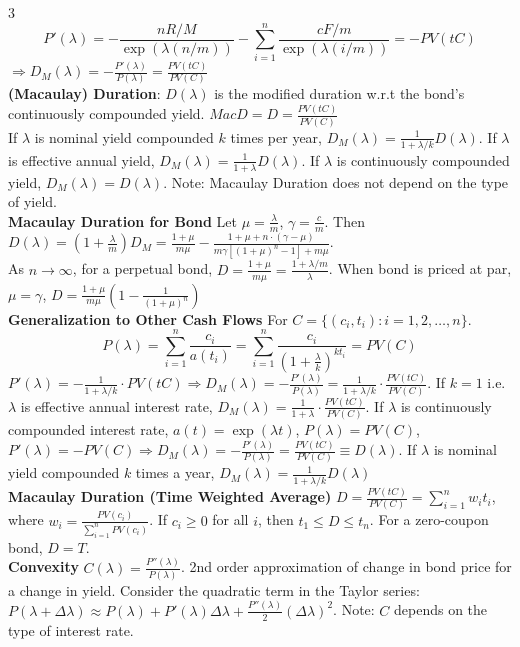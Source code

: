 \documentclass{article}
\begin{document}
{\begin{multicols*}{3}
\vspace{-10pt}
$$P'(\lambda)=-\frac{nR/M}{\exp(\lambda(n/m))}-\sum_{i=1}^n\frac{cF/m}{\exp(\lambda(i/m))}=-PV(tC)$$
$\Rightarrow D_M(\lambda)=-\frac{P'(\lambda)}{P(\lambda)}=\frac{PV(tC)}{PV(C)}$\\
\textbf{(Macaulay) Duration}: $D(\lambda)$ is the modified duration w.r.t the bond's continuously compounded yield. $MacD=D=\frac{PV(tC)}{PV(C)}$\\
If $\lambda$ is nominal yield compounded $k$ times per year, $D_M(\lambda)=\frac{1}{1+\lambda/k}D(\lambda)$. If $\lambda$ is effective annual yield, $D_M(\lambda)=\frac{1}{1+\lambda}D(\lambda)$. If $\lambda$ is continuously compounded yield, $D_M(\lambda)=D(\lambda)$. Note: Macaulay Duration does not depend on the type of yield.\\
\textbf{Macaulay Duration for Bond} Let $\mu=\frac{\lambda}{m}$, $\gamma=\frac{c}{m}$. Then $D(\lambda)=(1+\frac{\lambda}{m})D_M=\frac{1+\mu}{m\mu}-\frac{1+\mu+n\cdot(\gamma-\mu)}{m\gamma[(1+\mu)^n-1]+m\mu}$. \\
As $n\to\infty$, for a perpetual bond, $D=\frac{1+\mu}{m\mu}=\frac{1+\lambda/m}{\lambda}$. When bond is priced at par, $\mu=\gamma$, $D=\frac{1+\mu}{m\mu}\left(1-\frac{1}{(1+\mu)^n}\right)$\\
\textbf{Generalization to Other Cash Flows} For $C=\{(c_i,t_i):i=1,2,\dots,n\}$. 
\vspace{-5pt}
$$P(\lambda)=\sum_{i=1}^n\frac{c_i}{a(t_i)}=\sum_{i=1}^n\frac{c_i}{(1+\frac{\lambda}{k})^{kt_i}}=PV(C)$$
$P'(\lambda)=-\frac{1}{1+\lambda/k}\cdot PV(tC) \Rightarrow D_M(\lambda)=-\frac{P'(\lambda)}{P(\lambda)}=\frac{1}{1+\lambda/k}\cdot\frac{PV(tC)}{PV(C)}$. If $k=1$ i.e. $\lambda$ is effective annual interest rate, $D_M(\lambda)=\frac{1}{1+\lambda}\cdot\frac{PV(tC)}{PV(C)}$. If $\lambda$ is continuously compounded interest rate, $a(t)=\exp(\lambda t)$, $P(\lambda)=PV(C)$, $P'(\lambda)=-PV(C) \Rightarrow D_M(\lambda)=-\frac{P'(\lambda)}{P(\lambda)}=\frac{PV(tC)}{PV(C)}\equiv D(\lambda)$. If $\lambda$ is nominal yield compounded $k$ times a year, $D_M(\lambda)=\frac{1}{1+\lambda/k}D(\lambda)$\\
\textbf{Macaulay Duration (Time Weighted Average)} $D=\frac{PV(tC)}{PV(C)}=\sum_{i=1}^nw_it_i$, where $w_i=\frac{PV(c_i)}{\sum_{i=1}^n PV(c_i)}$. If $c_i\geq 0$ for all $i$, then $t_1\leq D\leq t_n$. For a zero-coupon bond, $D=T$.\\
\textbf{Convexity}  $C(\lambda)=\frac{P''(\lambda)}{P(\lambda)}$. 2nd order approximation of change in bond price for a change in yield. Consider the quadratic term in the Taylor series: $P(\lambda+\Delta\lambda)\approx P(\lambda)+P'(\lambda)\Delta\lambda+\frac{P''(\lambda)}{2}(\Delta\lambda)^2$. Note: $C$ depends on the type of interest rate.  \\

\end{multicols*}}
\end{document}
